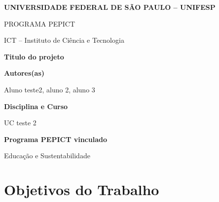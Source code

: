 \documentclass[12pt,a4paper]{article}
\begin{document}

\begin{center}

{\large \textbf{UNIVERSIDADE FEDERAL DE SÃO PAULO -- UNIFESP}}

\vspace{0.3cm}

{\normalsize PROGRAMA PEPICT}

\vspace{0.3cm}

{\normalsize ICT -- Instituto de Ciência e Tecnologia}

\vspace{1cm}

{\Large \textbf{Titulo do projeto}}

\end{center}

\vspace{1cm}


\noindent
\textbf{Autores(as)}

Aluno teste2, aluno 2, aluno 3

\vspace{0.7cm}


\noindent
\textbf{Disciplina e Curso}

UC teste 2

\vspace{0.7cm}


\noindent
\textbf{Programa PEPICT vinculado}

Educação e Sustentabilidade

\vspace{0.7cm}


\section*{Objetivos do Trabalho}
\end{document}
